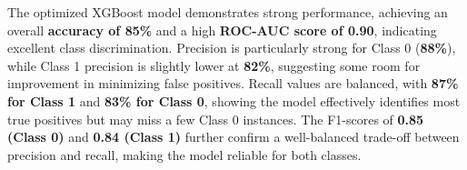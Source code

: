 \documentclass{mcmthesis}
\begin{document}
The optimized XGBoost model demonstrates strong performance, achieving an overall \textbf{accuracy of 85\%} and a high \textbf{ROC-AUC score of 0.90}, indicating excellent class discrimination. Precision is particularly strong for Class 0 (\textbf{88\%}), while Class 1 precision is slightly lower at \textbf{82\%}, suggesting some room for improvement in minimizing false positives. Recall values are balanced, with \textbf{87\% for Class 1} and \textbf{83\% for Class 0}, showing the model effectively identifies most true positives but may miss a few Class 0 instances. The F1-scores of \textbf{0.85 (Class 0)} and \textbf{0.84 (Class 1)} further confirm a well-balanced trade-off between precision and recall, making the model reliable for both classes.
	
	
	
	
	

	
\end{document}

